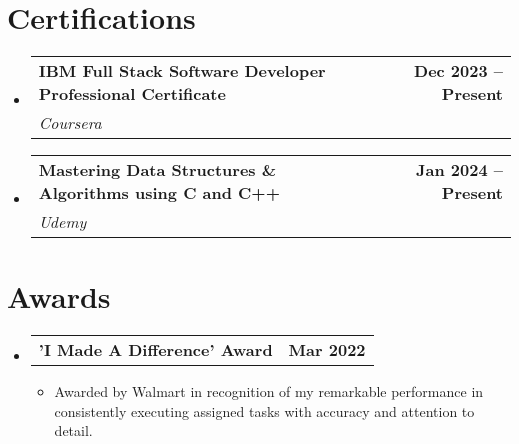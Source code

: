 \documentclass[a4,11pt]{article}
\makeatletter
\newcommand{\resumeItem}[1]{
  \item\small{
    {#1 \vspace{-2pt}}
  }
}
\newcommand{\resumeSubheading}[4]{
  \vspace{-2pt}\item
    \begin{tabular*}{1.0\textwidth}[t]{l@{\extracolsep{\fill}}r}
      \textbf{#1} & \textbf{\small #2} \\
      \textit{\small#3} & \textit{\small #4} \\
    \end{tabular*}\vspace{-7pt}
}
\newcommand{\resumeProjectHeading}[2]{
    \item
    \begin{tabular*}{1.001\textwidth}{l@{\extracolsep{\fill}}r}
      \small#1 & \textbf{\small #2}\\
    \end{tabular*}\vspace{-7pt}
}
\newcommand{\resumeSubHeadingListStart}{\begin{itemize}[leftmargin=0.0in, label={}]}
\newcommand{\resumeSubHeadingListEnd}{\end{itemize}}
\newcommand{\resumeItemListStart}{\begin{itemize}}
\newcommand{\resumeItemListEnd}{\end{itemize}\vspace{-5pt}}
\makeatother
\begin{document}
\section{Certifications}
    \resumeSubHeadingListStart
        \resumeSubheading{IBM Full Stack Software Developer Professional Certificate}{Dec 2023 -- Present}{Coursera}{}
        \resumeSubheading{Mastering Data Structures \& Algorithms using C and C++}{Jan 2024 -- Present}{Udemy}{}
    \resumeSubHeadingListEnd

\section{Awards}
    \vspace{-5pt}
    \resumeSubHeadingListStart
      \resumeProjectHeading
          {\textbf{'I Made A Difference' Award}}{Mar 2022}
          \resumeItemListStart
            \resumeItem{Awarded by Walmart in recognition of my remarkable performance in consistently executing assigned tasks with accuracy and attention to detail.}
          \resumeItemListEnd
          \vspace{-13pt}
    \resumeSubHeadingListEnd
\vspace{-16pt}
    
\end{document}
